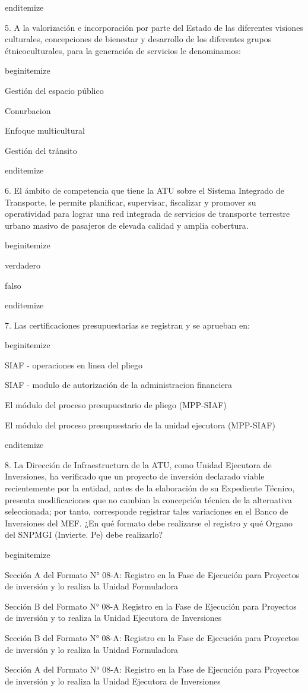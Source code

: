 end{itemize}

5. A la valorización e incorporación por parte del Estado de las diferentes visiones culturales, concepciones de bienestar y desarrollo de los diferentes grupos étnicoculturales, para la generación de servicios le denominamos:

begin{itemize}
			\item Gestión del espacio público 
			\item Conurbacion
			\item Enfoque multicultural
			\item Gestión del tránsito 

end{itemize}

6. El ámbito de competencia que tiene la ATU sobre el Sistema Integrado de Transporte, le permite planificar, supervisar, fiscalizar y promover su operatividad para lograr una red integrada de servicios de transporte terrestre urbano masivo de pasajeros de elevada calidad y amplia cobertura.  

begin{itemize}
			\item verdadero
			\item falso

end{itemize}

7. Las certificaciones presupuestarias se registran y se aprueban en: 

begin{itemize}
			\item SIAF - operaciones en linea del pliego
			\item SIAF - modulo de autorización de la administracion financiera
			\item El módulo del proceso presupuestario de pliego (MPP-SIAF)
			\item El módulo del proceso presupuestario de la unidad ejecutora (MPP-SIAF)

end{itemize}

8. La Dirección de Infraestructura de la ATU, como Unidad Ejecutora de Inversiones, ha verificado que un proyecto de inversión declarado viable recientemente por la entidad, antes de la elaboración de su Expediente Técnico, presenta modificaciones que no cambian la concepción técnica de la alternativa seleccionada; por tanto, corresponde registrar tales variaciones en el Banco de Inversiones del MEF. ¿En qué formato debe realizarse el registro y qué Organo del SNPMGI (Invierte. Pe) debe realizarlo?

begin{itemize}
			\item Sección A del Formato N° 08-A: Registro en la Fase de Ejecución para Proyectos de inversión y lo realiza la Unidad Formuladora 
			\item Sección B del Formato N° 08-A Registro en la Fase de Ejecución para Proyectos de inversión y to realiza la Unidad Ejecutora de Inversiones 
			\item Sección B del Formato N° 08-A: Registro en la Fase de Ejecución para Proyectos de inversión y lo realiza la Unidad Formuladora
			\item Sección A del Formato N° 08-A: Registro en la Fase de Ejecución para Proyectos de inversión y lo realiza la Unidad Ejecutora de Inversiones 


